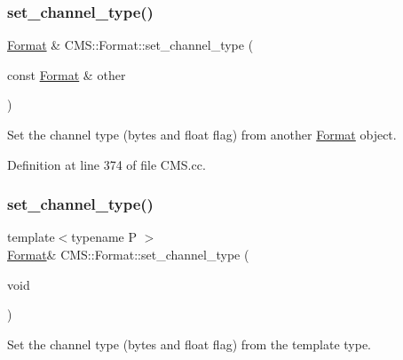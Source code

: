 \mbox{\label{class_c_m_s_1_1_format_ae1e1a3d0c6bf76dab339c7b9e103b7c0}} 
\subsubsection{\texorpdfstring{set\+\_\+channel\+\_\+type()}{set\_channel\_type()}\hspace{0.1cm}{\footnotesize\ttfamily [2/8]}}
{\footnotesize\ttfamily \hyperlink{class_c_m_s_1_1_format}{Format} \& C\+M\+S\+::\+Format\+::set\+\_\+channel\+\_\+type (\begin{DoxyParamCaption}\item[{const \hyperlink{class_c_m_s_1_1_format}{Format} \&}]{other }\end{DoxyParamCaption})}



Set the channel type (bytes and float flag) from another \hyperlink{class_c_m_s_1_1_format}{Format} object. 



Definition at line 374 of file C\+M\+S.\+cc.

\mbox{\label{class_c_m_s_1_1_format_aaf4e13c47420efcef6a70e0a5045d708}} 
\subsubsection{\texorpdfstring{set\+\_\+channel\+\_\+type()}{set\_channel\_type()}\hspace{0.1cm}{\footnotesize\ttfamily [3/8]}}
{\footnotesize\ttfamily template$<$typename P $>$ \\
\hyperlink{class_c_m_s_1_1_format}{Format}\& C\+M\+S\+::\+Format\+::set\+\_\+channel\+\_\+type (\begin{DoxyParamCaption}\item[{void}]{ }\end{DoxyParamCaption})}



Set the channel type (bytes and float flag) from the template type. 

